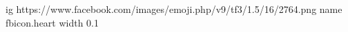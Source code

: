  
 
 
 
 
\ifcmt
  ig https://www.facebook.com/images/emoji.php/v9/tf3/1.5/16/2764.png
	name fbicon.heart
  width 0.1
\fi
